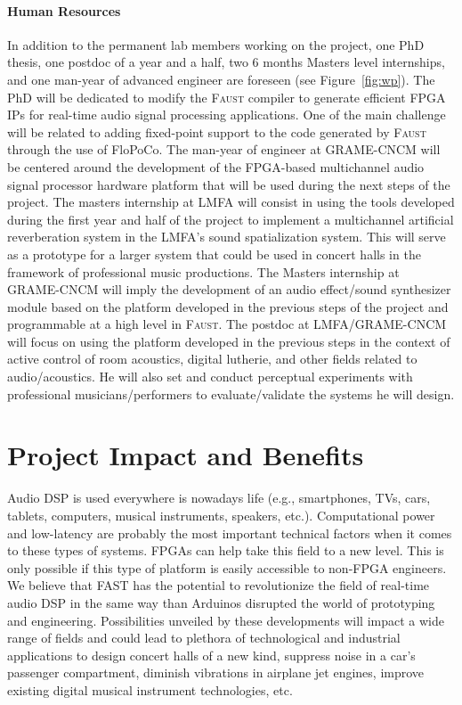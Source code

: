 \documentclass[a4paper,10pt]{article}
\newcommand{\F}{\textsc{Faust}}
\newcommand{\PP}{FAST}
\begin{document}
\paragraph{Human Resources}

In addition to the permanent lab members working on the project, one PhD thesis, one postdoc of a year and a half, two 6 months Masters level internships, and one man-year of advanced engineer are foreseen (see Figure~\ref{fig:wp}). The PhD will be dedicated to modify the \F{} compiler to generate efficient FPGA IPs for real-time audio signal processing applications. One of the main challenge will be related to adding fixed-point support to the code generated by \F{} through the use of FloPoCo. The man-year of engineer at GRAME-CNCM will be centered around the development of the FPGA-based multichannel audio signal processor hardware platform that will be used during the next steps of the project. The masters internship at LMFA will consist in using the tools developed during the first year and half of the project to implement a multichannel artificial reverberation system in the LMFA's sound spatialization system. This will serve as a prototype for a larger system that could be used in concert halls in the framework of professional music productions. The Masters internship at GRAME-CNCM will imply the development of an audio effect/sound synthesizer module based on the platform developed in the previous steps of the project and programmable at a high level in \F{}. The postdoc at LMFA/GRAME-CNCM will focus on using the platform developed in the previous steps in the context of active control of room acoustics, digital lutherie, and other fields related to audio/acoustics. He will also set and conduct perceptual experiments with professional musicians/performers to evaluate/validate the systems he will design. 


\section*{Project Impact and Benefits}

Audio DSP is used everywhere is nowadays life (e.g., smartphones, TVs, cars, tablets, computers, musical instruments, speakers, etc.). Computational power and low-latency are probably the most important technical factors when it comes to these types of systems. FPGAs can help take this field to a new level. This is only possible if this type of platform is easily accessible to non-FPGA engineers. We believe that \PP{} has the potential to revolutionize the field of real-time audio DSP in the same way than Arduinos disrupted the world of prototyping and engineering. %
Possibilities unveiled by these developments will impact a wide range of fields and could lead to plethora of technological and industrial applications to design concert halls of a new kind, suppress noise in a car's passenger compartment, diminish vibrations in airplane jet engines, improve existing digital musical instrument technologies, etc. 
\end{document}
